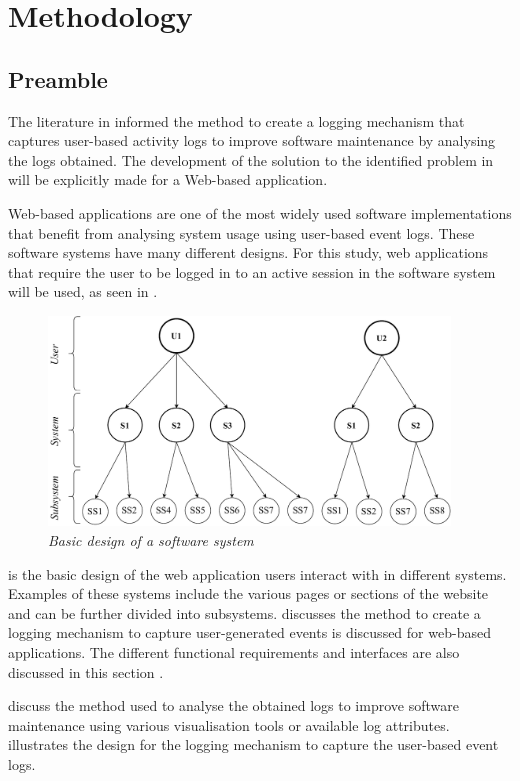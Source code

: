 \chapter{Methodology}
\label{chap:2}

\section{Preamble}\label{sec:ch2_preamble}
 The literature in  informed the method to create a logging mechanism that captures user-based activity logs to improve software maintenance by analysing the logs obtained. The development of the solution to the identified problem in  will be explicitly made for a Web-based application.\par Web-based applications are one of the most widely used software implementations that benefit from analysing system usage using user-based event logs. These software systems have many different designs. For this study, web applications that require the user to be logged in to an active session in the software system will be used, as seen in .

 \begin{figure}[!htb]
	\centering %
	\includegraphics[width=0.95\textwidth]{img/Chapter2/systemOverview/systemOverview.pdf}
	\caption[Basic design of a software system]
	{\textit{Basic design of a software system}}\label{fig:ch2_webSystemBasic}
\end{figure}
 
 is the basic design of the web application users interact with in different systems. Examples of these systems include the various pages or sections of the website and can be further divided into subsystems.  discusses the method to create a logging mechanism to capture user-generated events is discussed for web-based applications. The different functional requirements and interfaces are also discussed in this section \cite{Anish2015}. \par {} discuss the method used to analyse the obtained logs to improve software maintenance using various visualisation tools or available log attributes.  illustrates the design for the logging mechanism to capture the user-based event logs.

